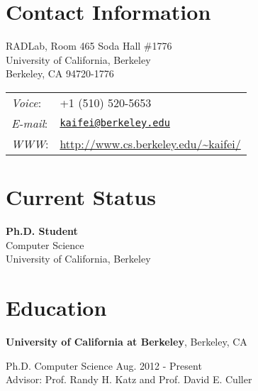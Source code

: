 \documentclass[margin,line]{res}
\newenvironment{list1}{
  \begin{list}{\ding{113}}{
      \setlength{\itemsep}{0in}
      \setlength{\parsep}{0in} \setlength{\parskip}{0in}
      \setlength{\topsep}{0in} \setlength{\partopsep}{0in}
      \setlength{\leftmargin}{0.17in}}}{\end{list}}
\begin{document}

  \begin{resume}

    \section{\sc Contact Information}

      \vspace{.05in}
      \begin{minipage}{0.45\linewidth}
        RADLab, Room 465 Soda Hall \#1776 \\
        University of California, Berkeley \\
        Berkeley, CA 94720-1776
      \end{minipage}
      \begin{minipage}{0.45\linewidth}
        \begin{tabular}{ll}
          \textit{Voice}: & +1 (510) 520-5653 \\
          \textit{E-mail}: & \href{mailto:kaifei@berkeley.edu}{\tt kaifei@berkeley.edu} \\
          \textit{WWW}: & \url{http://www.cs.berkeley.edu/~kaifei/}
        \end{tabular}
      \end{minipage}


    \section{\sc Current Status}

      {\bf Ph.D. Student} \\
      Computer Science  \\
      University of California, Berkeley




    \section{\sc Education}

      {\bf University of California at Berkeley}, Berkeley, CA \\
      \vspace*{-.1in}
      \begin{list1}
        \item[] Ph.D. Computer Science \hfill Aug. 2012 - Present \\ 
        Advisor: Prof. Randy H. Katz and Prof. David E. Culler
      \end{list1}


\end{resume}
\end{document}
